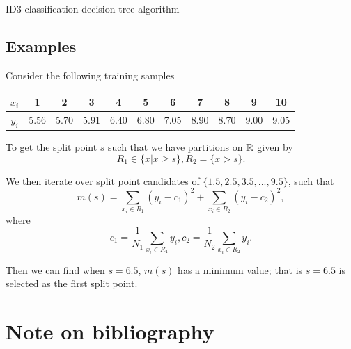 \begin{refsection}
\begin{algorithm}[H]
	\caption{ID3 classification decision tree algorithm}
\end{algorithm}



\subsection{Examples}


\begin{example}
	Consider the following training samples \\
	\begin{tabular}{|c|c|c|c|c|c|c|c|c|c|c|}
		\hline 
		$x_i$ & 1 & 2 & 3 & 4 & 5 & 6 & 7 & 8 & 9 & 10 \\ 
		\hline 
		$y_i$ & 5.56 & 5.70 & 5.91 & 6.40 & 6.80 & 7.05 & 8.90 & 8.70 & 9.00 & 9.05 \\ 
		\hline 
	\end{tabular} 	
	
	
	To get the split point $s$ such that we have partitions on $\mathbb{R}$ given by
	$$R_1\in \{x|x\geq s\}, R_2=\{x > s\}.$$
	
	We then iterate over split point candidates of $\{1.5, 2.5, 3.5, ..., 9.5 \}$, such that
	$$m(s) = \sum_{x_i\in R_1}(y_i - c_1)^2 + \sum_{x_i\in R_2}(y_i - c_2)^2,$$
	where $$c_1 = \frac{1}{N_1}\sum_{x_i\in R_1}y_i, c_2 = \frac{1}{N_2}\sum_{x_i\in R_2}y_i. $$
	
	Then we can find when $s = 6.5$, $m(s)$ has a minimum value; that is $s=6.5$ is selected as the first split point.
\end{example}



\section{Note on bibliography}

\end{refsection}

